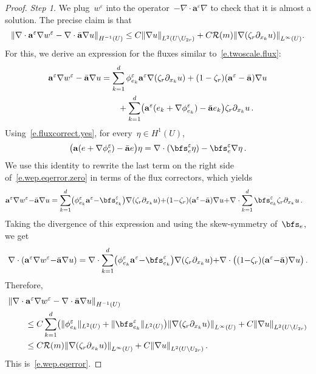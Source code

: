 \documentclass[11pt,twoside]{article} %
\numberwithin{equation}{section}
\theoremstyle{definition}
\let\originalleft\left
\let\originalright\right
\renewcommand{\left}{\mathopen{}\mathclose\bgroup\originalleft}
\renewcommand{\right}{\aftergroup\egroup\originalright}
\newcommand{\eps}{\varepsilon}
\newcommand{\ep}{\eps}
\renewcommand{\a}{\mathbf{a}}
\newcommand{\ahom}{\bar{\a}}
\begin{document}
\begin{proof}
\emph{Step 1.} We plug~$w^\ep$ into the operator~$-\nabla \cdot \a^\ep \nabla$ to check that it is almost a solution. The precise claim is that
\begin{align}
\label{e.wep.eqerror}
\left\| 
\nabla \cdot \a^\ep \nabla w^\ep - \nabla \cdot \ahom \nabla u 
\right\|_{H^{-1}(U)}
\leq C \left\| \nabla u \right\|_{L^2(U \setminus U_{2r})}
+ 
C \mathcal{R}( m ) \left\| \nabla (\zeta_r \partial_{x_k} u) \right\|_{L^\infty(U)}  
. 
\end{align}
For this, we derive an expression for the fluxes similar to~\eqref{e.twoscale.flux}:
\begin{align}  \label{e.wep.eqerror.zero}
\a^\ep \nabla w^\ep - \ahom \nabla u
& =
\sum_{k=1}^d 
\phi_{e_k}^\ep \a^\ep \nabla (\zeta_r \partial_{x_k} u) 
+
(1-\zeta_r)(\a^\ep - \ahom) \nabla u 
\notag \\  &
\qquad + \sum_{k=1}^d \left( \a^\ep (e_k + \nabla \phi_{e_k}^\ep) - \ahom e_k \right) \zeta_r \partial_{x_k} u
\,.
\end{align}
Using~\eqref{e.fluxcorrect.yes}, for every~$\eta \in H^1(U)$, 
\begin{equation}
\label{e.wep.eqerror.three}
\bigl( \a(e+\nabla\phi_{e}^\ep) - \ahom e \bigr) \eta 
=
 \nabla \cdot \left( \bfs_{e}^\ep \eta \right) - 
\bfs_{e}^\ep \nabla \eta
\,.
\end{equation}
We use this identity to rewrite the last term on the right side of~\eqref{e.wep.eqerror.zero} in terms of the flux correctors, which yields 
\begin{align}
\label{e.wep.eqerror.zero.2}
\a^\ep \nabla w^\ep {-} \ahom \nabla u
& =
\sum_{k=1}^d 
\bigl( \phi_{e_k}^\ep \a^\ep  {-} \bfs_{e_k}^\ep \bigr) \nabla (\zeta_r \partial_{x_k} u) 
{+}
(1{-}\zeta_r)(\a^\ep {-} \ahom) \nabla u 
 {+} \nabla \cdot \sum_{k=1}^d \bfs_{e_k}^\ep \zeta_r \partial_{x_k} u
\,.
\end{align}
Taking the divergence of this expression and using the skew-symmetry of~$\bfs_e$, we get
\begin{equation}
\label{e.wep.eqerror.zero.2.div}
\nabla \cdot ( \a^\ep \nabla w^\ep {-} \ahom \nabla u )
=
\nabla \cdot \sum_{k=1}^d 
\bigl( \phi_{e_k}^\ep \a^\ep  {-} \bfs_{e_k}^\ep \bigr) \nabla (\zeta_r \partial_{x_k} u) 
{+}
\nabla \cdot \bigl( (1{-}\zeta_r)(\a^\ep {-} \ahom) \nabla u  \bigr)
\,.
\end{equation}
Therefore, 
\begin{align} \notag
\lefteqn{
\left\| 
\nabla \cdot \a^\ep \nabla w^\ep - \nabla \cdot \ahom \nabla u 
\right\|_{H^{-1}(U)}
} \qquad &
\\ 
\notag &
\leq
C \sum_{k=1}^d \bigl( \| \phi_{e_k}^\ep \|_{L^2(U)} + \| \bfs_{e_k}^\ep \|_{L^2(U)} \bigr) 
\left\| \nabla (\zeta_r \partial_{x_k} u) \right\|_{L^\infty(U)} + C \left\| \nabla u \right\|_{L^2(U \setminus U_{2r})}
\\ \notag & 
\leq
C \mathcal{R}(m) \left\| \nabla (\zeta_r \partial_{x_k} u) \right\|_{L^\infty(U)} + C \left\| \nabla u \right\|_{L^2(U \setminus U_{2r})}
\,.
\end{align}
This is~\eqref{e.wep.eqerror}.
\smallskip


\end{proof}
\end{document}
